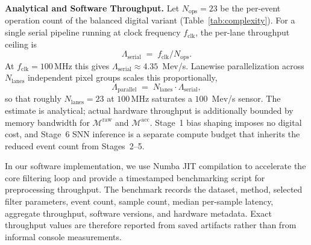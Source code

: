 \documentclass[a4paper,fleqn]{cas-dc}
\begin{document}
\begin{table}[t]
\centering
\caption{Analytical per-event cost for Stages~2--5}
\label{tab:complexity}
\end{table}

\textbf{Analytical and Software Throughput.}
Let $N_{\text{ops}}=23$ be the per-event operation count of the balanced digital variant (Table~\ref{tab:complexity}). For a single serial pipeline running at clock frequency $f_{\text{clk}}$, the per-lane throughput ceiling is
\begin{equation}
\Lambda_{\text{serial}} \;=\; f_{\text{clk}}/N_{\text{ops}}.
\label{eq:throughput_serial}
\end{equation}
At $f_{\text{clk}}=100$\,MHz this gives $\Lambda_{\text{serial}}\approx 4.35$~Mev/s. Lanewise parallelization across $N_{\text{lanes}}$ independent pixel groups scales this proportionally,
\begin{equation}
\Lambda_{\text{parallel}} \;=\; N_{\text{lanes}}\cdot \Lambda_{\text{serial}},
\label{eq:throughput_parallel}
\end{equation}
so that roughly $N_{\text{lanes}}=23$ at $100$\,MHz saturates a $100$~Mev/s sensor. The estimate is analytical; actual hardware throughput is additionally bounded by memory bandwidth for $\mathcal{M}^{\text{raw}}$ and $\mathcal{M}^{\text{acc}}$. Stage~1 bias shaping imposes no digital cost, and Stage~6 SNN inference is a separate compute budget that inherits the reduced event count from Stages~2--5.

In our software implementation, we use Numba JIT compilation to accelerate the core filtering loop and provide a timestamped benchmarking script for preprocessing throughput. The benchmark records the dataset, method, selected filter parameters, event count, sample count, median per-sample latency, aggregate throughput, software versions, and hardware metadata. Exact throughput values are therefore reported from saved artifacts rather than from informal console measurements.
\end{document}
